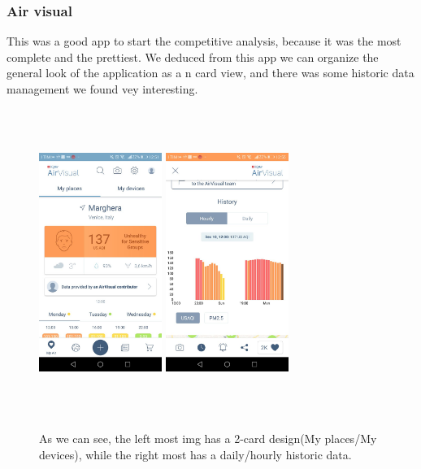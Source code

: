 \documentclass[12pt]{article} %
\begin{document}
\begin{itemize}
\subsubsection{Air visual}
This was a good app to start the competitive analysis, because it was the most complete and the prettiest.
We deduced from this app we can organize the general look of the application as a n card view, and there was some historic data management we found vey interesting.
\begin{figure}[H]
  \centering
  \includegraphics[width=4cm,height=10cm,keepaspectratio]{img/AirVisual1.jpeg}
  \hspace{0.1\textwidth}
  \includegraphics[width=4cm,height=10cm,keepaspectratio]{img/AirVisual2.jpeg}
  \hfill
  \caption{As we can see, the left most img has a 2-card design(My places/My devices), while the right most
  has a daily/hourly historic data.}
  \label{fig:boat4}
\end{figure}



\end{itemize}
\end{document}
